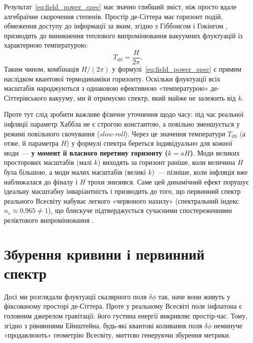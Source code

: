 \begin{keybox}[title={Зауваження: де-Сіттерівська температура і термодинамічний зміст спектра}]
Результат~\eqref{eq:field_power_spec} має значно глибший зміст, ніж просто вдале
алгебраїчне скорочення степенів. Простір де-Сіттера має горизонт подій, обмеження доступу
до інформації за яким, згідно з Гіббонсом і Гокінгом \cite{gibbons_hawking_1977},
призводить до виникнення теплового випромінювання вакуумних флуктуацій із характерною
температурою:
\begin{equation*}
  T_\mathrm{dS} = \frac{H}{2\pi}.
\end{equation*}
Таким чином, комбінація $H/(2\pi)$ у формулі~\eqref{eq:field_power_spec} є прямим
наслідком квантової термодинаміки горизонту. Оскільки флуктуації всіх масштабів
народжуються з однаковою ефективною «температурою» де-Сіттерівського вакууму,
ми й отримуємо спектр, який майже не залежить від $k$.
\end{keybox}

Проте тут слід зробити важливе фізичне уточнення щодо часу: під час реальної інфляції
параметр Хаббла не є строгою константою, а повільно зменшується у режимі повільного
скочування (\emph{slow-roll}). Через це значення температури $T_\mathrm{dS}$ (а отже,
й параметра $H$) у формулі спектра береться індивідуально для кожної моди~--- \textbf{у момент
її власного перетину горизонту ($k = aH$)}. Моди великих просторових масштабів (малі $k$)
виходять за горизонт раніше, коли величина $H$ була більшою, а моди малих масштабів
(великі $k$)~--- пізніше, коли інфляція вже наближалася до фіналу і $H$ трохи знизився.
Саме цей динамічний ефект порушує ідеальну масштабну інваріантність і призводить до того,
що первинний спектр реального Всесвіту набуває легкого «червоного нахилу» (спектральний
індекс $n_s \approx 0.965 \neq 1$), що блискуче підтверджується сучасними спостереженнями
реліктового випромінювання \cite{planck_2018}.

\section{Збурення кривини і первинний спектр}

Досі ми розглядали флуктуації скалярного поля $\delta\phi$ так, наче вони живуть
у фіксованому просторі де-Сіттера. Проте у реальному Всесвіті поле інфлатона є
головним джерелом гравітації: його густина енергії викривляє простір-час. Тому,
згідно з рівняннями Ейнштейна, будь-які квантові коливання поля $\delta\phi$ неминуче
«продавлюють» геометрію Всесвіту, миттєво генеруючи збурення метрики.

